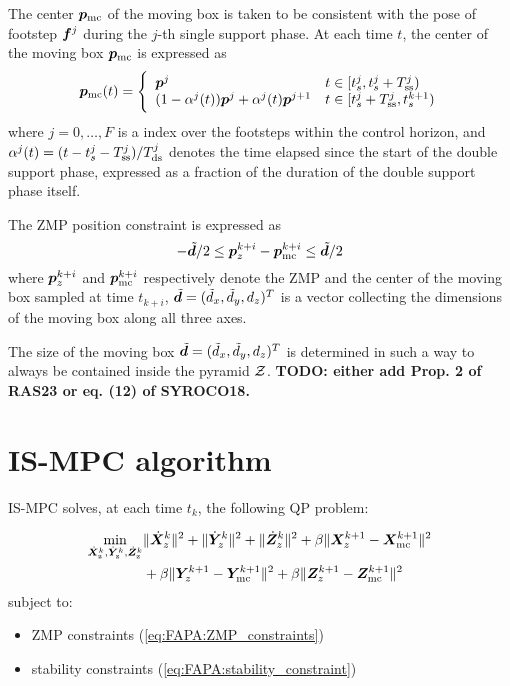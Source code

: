 The center ${\bm{p}}_{\rm mc}$ of the moving box is taken to be consistent with the pose of footstep ${\bm{f}}^j$ during the $j$-th single support phase. At each time $t$, the center of the moving box ${\bm{p}}_{\rm mc}$ is expressed as
\begin{equation}\label{eq:WoS: moving constraint}
{\bm{p}}_{\rm mc}(t) = \Bigg\{
\begin{array}{ll}
{\bm{p}}^j & t\in [t_s^j, t_s^j + T_{\rm ss}^j) \\
(1-\alpha^j(t)){\bm{p}}^j + \alpha^j(t){\bm{p}}^{j+1} & t\in [t_s^j + T_{\rm ss}^j, t_s^{k+1})
\end{array}
\end{equation}
where $j=0,\dots,F$ is a index over the footsteps within the control horizon, and $\alpha^j(t) = (t-t_s^j-T_{\rm ss}^j)/T_{\rm ds}^j$ denotes the time elapsed since the start of the double support phase, expressed as a fraction of the duration of the double support phase itself.

The ZMP position constraint is expressed as
\begin{equation}\label{eq:WoS:ZMP_constraint}
-\tilde{{\bm{d}}} /2 \le {\bm{p}}_z^{k+i} - {\bm{p}}_{\rm mc}^{k+i} \le \tilde{{\bm{d}}} /2
\end{equation}
where ${\bm{p}}_z^{k+i}$ and ${\bm{p}}_{\rm mc}^{k+i}$ respectively denote the ZMP and the center of the moving box sampled at time $t_{k+i}$, $\tilde {{\bm{d}}} = (\tilde d_x, \tilde d_y, d_z)^T$
is a vector collecting the dimensions of the moving box along all three axes.

The size of the moving box $\tilde {{\bm{d}}} = (\tilde d_x, \tilde d_y, d_z)^T$ is determined in such a way to always be contained inside the pyramid $\cal Z$. \textbf{TODO: either add Prop. 2 of RAS23 or eq. (12) of SYROCO18.}

\section{IS-MPC algorithm}
IS-MPC solves, at each time $t_k$, the following QP problem:
\begin{braced}
\begin{equation}
\begin{split}
\min_{\dot{\bm{X}}_\text{z}^k, \dot{\bm{Y}}_\text{z}^k, \dot{\bm{Z}}_\text{z}^k}
&\|\dot{\bm{X}}_z^k\|^2 + \|\dot{\bm{Y}}_z^k\|^2 + \|\dot{\bm{Z}}_z^k\|^2+\beta \|\bm{X}_z^{k+1} - {\bm{X}}_{\rm mc}^{k+1}\|^2 \\& + \beta \|\bm{Y}_z^{k+1} - {\bm{Y}}_{\rm mc}^{k+1}\|^2 + \beta \|\bm{Z}_z^{k+1} - {\bm{Z}}_{\rm mc}^{k+1}\|^2 \\
\end{split}
\label{eq:ISMPC-algorithm}
\end{equation}
\hspace{0.25cm} subject to:
\begin{itemize}
\item ZMP constraints (\ref{eq:FAPA:ZMP_constraints})
\item stability constraints (\ref{eq:FAPA:stability_constraint})
\end{itemize}
\end{braced}


